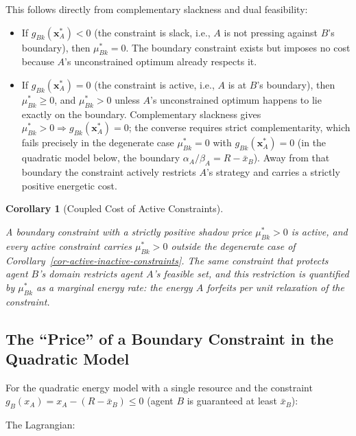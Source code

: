 \documentclass[11pt]{article}
\theoremstyle{plain}
\newtheorem{corollary}[theorem]{Corollary}
\theoremstyle{definition}
\theoremstyle{remark}
\let\origsubsection\subsection
\renewcommand{\subsection}{\needspace{7\baselineskip}\origsubsection}
\providecommand{\tightlist}{%
  \setlength{\itemsep}{0pt}\setlength{\parskip}{0pt}}
\begin{document}
This follows directly from complementary slackness and dual feasibility:

\begin{itemize}
\tightlist
\item
  If \(g_{Bk}(\mathbf{x}_A^*) < 0\) (the constraint is slack, i.e.,
  \(A\) is not pressing against \(B\)'s boundary), then
  \(\mu_{Bk}^* = 0\). The boundary constraint exists but imposes no cost
  because \(A\)'s unconstrained optimum already respects it.
\item
  If \(g_{Bk}(\mathbf{x}_A^*) = 0\) (the constraint is active, i.e.,
  \(A\) is at \(B\)'s boundary), then \(\mu_{Bk}^* \geq 0\), and
  \(\mu_{Bk}^* > 0\) unless \(A\)'s unconstrained optimum happens to lie
  exactly on the boundary. Complementary slackness gives
  \(\mu_{Bk}^* > 0 \Rightarrow g_{Bk}(\mathbf{x}_A^*) = 0\); the
  converse requires strict complementarity, which fails precisely in the
  degenerate case \(\mu_{Bk}^* = 0\) with \(g_{Bk}(\mathbf{x}_A^*) = 0\)
  (in the quadratic model below, the boundary
  \(\alpha_A / \beta_A = R - \bar{x}_B\)). Away from that boundary the
  constraint actively restricts \(A\)'s strategy and carries a strictly
  positive energetic cost.
\end{itemize}

\begin{corollary}[Coupled Cost of Active Constraints]
\label{cor-newtons-third-law}

A boundary constraint with a strictly positive shadow price $\mu_{Bk}^* > 0$ is active, and every active constraint carries $\mu_{Bk}^* > 0$ outside the degenerate case of Corollary~\ref{cor-active-inactive-constraints}. The same constraint that protects agent $B$'s domain restricts agent $A$'s feasible set, and this restriction is quantified by $\mu_{Bk}^*$ as a marginal energy rate: the energy $A$ forfeits per unit relaxation of the constraint.
\end{corollary}

\subsection{The ``Price'' of a Boundary Constraint in the Quadratic
Model}\label{the-price-of-a-boundary-constraint-in-the-quadratic-model}

For the quadratic energy model with a single resource and the constraint
\(g_B(x_A) = x_A - (R - \bar{x}_B) \leq 0\) (agent \(B\) is guaranteed
at least \(\bar{x}_B\)):

The Lagrangian:
\end{document}
